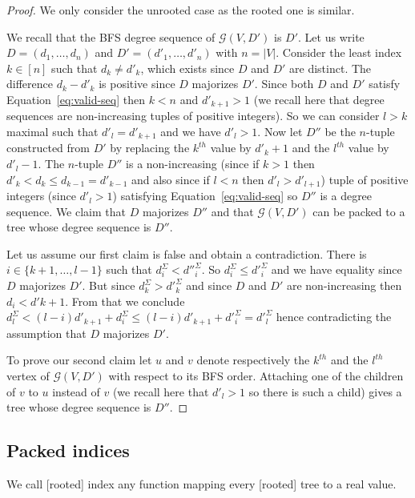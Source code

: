 \documentclass[11 pt]{modarticle}
\newcommand{\size}[1]{|#1|}
\newcommand{\greedy}[2]{\mathcal{G}(#1,#2)}
\begin{document}
\begin{proof}
We only consider the unrooted case as the rooted one is similar.

We recall that the BFS degree sequence of $\greedy{V}{D'}$ is $D'$. Let us write $D = (d_1, \dots, d_n)$ and $D' = (d'_1, \dots, d'_n)$ with $n = \size{V}$. Consider the least index $k \in [n]$ such that $d_k \neq d'_k$, which exists since $D$ and $D'$ are distinct. The difference $d_k - d'_k$ is positive since $D$ majorizes $D'$. Since both $D$ and $D'$ satisfy Equation~\eqref{eq:valid-seq} then $k < n$ and $d'_{k+1} > 1$ (we recall here that degree sequences are non-increasing tuples of positive integers). So we can consider $l > k$ maximal such that $d'_l = d'_{k+1}$ and we have $d'_l > 1$. Now let $D''$ be the $n$-tuple constructed from $D'$ by replacing the $k^{th}$ value by $d'_k+1$ and the $l^{th}$ value by $d'_l-1$. The $n$-tuple $D''$ is a non-increasing (since if $k > 1$ then $d'_k < d_k \leq d_{k-1} = d'_{k-1}$ and also since if $l < n$ then $d'_l > d'_{l+1}$) tuple of positive integers (since $d'_l > 1$) satisfying Equation~\eqref{eq:valid-seq} so $D''$ is a degree sequence. We claim that $D$ majorizes $D''$ and that $\greedy{V}{D'}$ can be packed to a tree whose degree sequence is $D''$.

Let us assume our first claim is false and obtain a contradiction. There is $i \in \{k+1, \dots, l-1\}$ such that $d^{\Sigma}_i < d''^{\Sigma}_i$. So $d^{\Sigma}_i \leq d'^{\Sigma}_i$ and we have equality since $D$ majorizes $D'$. But since $d^{\Sigma}_k > d'^{\Sigma}_k$ and since $D$ and $D'$ are non-increasing then $d_i < d'{k+1}$.  From that we conclude $d^{\Sigma}_l < (l-i) d'_{k+1} + d^{\Sigma}_i \leq (l-i) d'_{k+1} + d'^{\Sigma}_i = d'^{\Sigma}_l$ hence contradicting the assumption that $D$ majorizes $D'$. 

To prove our second claim let $u$ and $v$ denote respectively the $k^{th}$ and the $l^{th}$ vertex of $\greedy{V}{D'}$ with respect to its BFS order. Attaching one of the children of $v$ to $u$ instead of $v$ (we recall here that $d'_l > 1$ so there is such a child) gives a tree whose degree sequence is $D''$.
\end{proof}

\subsection{Packed indices}

We call [rooted] index any function mapping every [rooted] tree to a real value.
\end{document}
